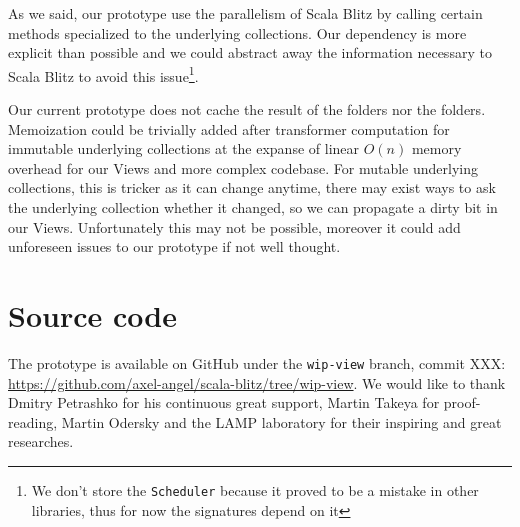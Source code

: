\documentclass[a4paper,12pt,twocolumn]{article}
\begin{document}
As we said, our prototype use the parallelism of Scala Blitz by calling certain methods specialized to the underlying collections.
Our dependency is more explicit than possible and we could abstract away the information necessary to Scala Blitz to avoid this issue\footnote{We don't store the {\tt Scheduler} because it proved to be a mistake in other libraries, thus for now the signatures depend on it}.


Our current prototype does not cache the result of the folders nor the folders.
Memoization could be trivially added after transformer computation for immutable underlying collections at the expanse of linear $O(n)$ memory overhead for our Views and more complex codebase.
For mutable underlying collections, this is tricker as it can change anytime, there may exist ways to ask the underlying collection whether it changed, so we can propagate a dirty bit in our Views.
Unfortunately this may not be possible, moreover it could add unforeseen issues to our prototype if not well thought.

\appendix
\section{Source code}
The prototype is available on GitHub under the \verb|wip-view| branch, commit XXX:
\url{https://github.com/axel-angel/scala-blitz/tree/wip-view}.
We would like to thank Dmitry Petrashko for his continuous great support, Martin Takeya for proof-reading, Martin Odersky and the LAMP laboratory for their inspiring and great researches.


{}

\end{document}

